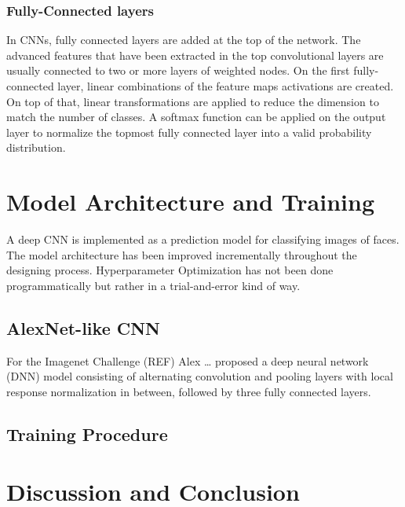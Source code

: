 \documentclass[twoside]{article}
\begin{document}
\begin{multicols}{2}
\subsubsection{Fully-Connected layers}
In CNNs, fully connected layers are added at the top of the network. The advanced features that have been extracted in the top convolutional layers are usually connected to two or more layers of weighted nodes. On the first fully-connected layer, linear combinations of the feature maps activations are created. On top of that, linear transformations are applied to reduce the dimension to match the number of classes. A softmax function can be applied on the output layer to normalize the topmost fully connected layer into a valid probability distribution.



\section{Model Architecture and Training}
A deep CNN is implemented as a prediction model for classifying images of faces. The model architecture has been improved incrementally throughout the designing process. Hyperparameter Optimization has not been done programmatically but rather in a trial-and-error kind of way.

\subsection{AlexNet-like CNN}
For the Imagenet Challenge (REF) Alex … proposed a deep neural network (DNN) model consisting of alternating convolution and pooling layers with local response normalization in between, followed by three fully connected layers.

\subsection{Training Procedure}



\section{Discussion and Conclusion}






\end{multicols}
\end{document}
